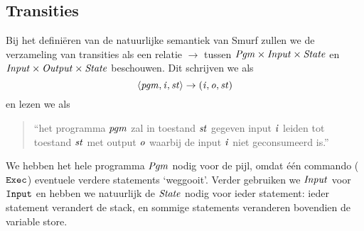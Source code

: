 \subsection{Transities}
\label{sec:def:trans}

Bij het definiëren van de natuurlijke semantiek van Smurf zullen we de
verzameling van transities als een relatie $\to$ tussen
$\mathit{Pgm}\times\mathit{Input}\times\mathit{State}$ en $\mathit{Input}\times\mathit{Output}\times\mathit{State}$ beschouwen.
Dit schrijven we als
$$\left\langle\mathit{pgm},\mathit{i},\mathit{st}\right\rangle\to\left(\mathit{i},\mathit{o},\mathit{st}\right)$$
en lezen we als
\begin{quote}
	``het programma $\mathit{pgm}$ zal in toestand $\mathit{st}$ gegeven input $\mathit{i}$ leiden tot
	toestand $\mathit{st}$ met output $\mathit{o}$ waarbij de input $\mathit{i}$ niet geconsumeerd is.''
\end{quote}

We hebben het hele programma $\mathit{Pgm}$ nodig voor de pijl, omdat één commando
($\texttt{Exec}$) eventuele verdere statements `weggooit'. %
Verder gebruiken we $\mathit{Input}$ voor $\texttt{Input}$ en hebben we natuurlijk de
$\mathit{State}$ nodig voor ieder statement: ieder statement verandert de stack, en
sommige statements veranderen bovendien de variable store.

